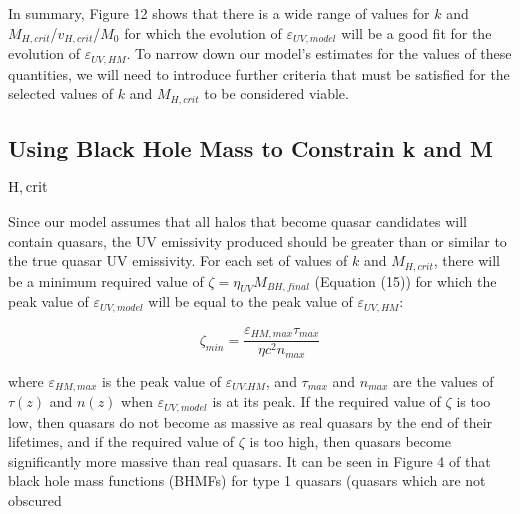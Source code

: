 \documentclass[12pt]{article}%
\begin{document}
In summary, Figure 12 shows that there is a wide range of values for $k$ and $M_{H,crit}$/$v_{H,crit}$/$M_0$ for which the evolution of $\varepsilon_{UV,model}$ will be a good fit for the evolution of $\varepsilon_{UV,HM}$. To narrow down our model's estimates for the values of these quantities, we will need to introduce further criteria that must be satisfied for the selected values of $k$ and $M_{H,crit}$ to be considered viable.

\subsection{Using Black Hole Mass to Constrain k and M$_{\mathrm{H,crit}}$}

Since our model assumes that all halos that become quasar candidates will contain quasars, the UV emissivity produced should be greater than or similar to the true quasar UV emissivity. For each set of values of $k$ and $M_{H,crit}$, there will be a minimum required value of $\zeta=\eta_{UV}M_{BH,final}$ (Equation (15)) for which the peak value of $\varepsilon_{UV,model}$ will be equal to the peak value of $\varepsilon_{UV,HM}$:

\begin{equation}
    \zeta_{min}=\frac{\varepsilon_{HM,max}\tau_{max}}{\eta c^2n_{max}}
\end{equation}

\noindent where $\varepsilon_{HM,max}$ is the peak value of $\varepsilon_{UV.HM}$, and $\tau_{max}$ and $n_{max}$ are the values of $\tau(z)$ and $n(z)$ when $\varepsilon_{UV,model}$ is at its peak. If the required value of $\zeta$ is too low, then quasars do not become as massive as real quasars by the end of their lifetimes, and if the required value of $\zeta$ is too high, then quasars become significantly more massive than real quasars. It can be seen in Figure 4 of \cite{BH_mass_fns} that black hole mass functions (BHMFs) for type 1 quasars (quasars which are not obscured

\newpage

\onecolumngrid
\end{document}
